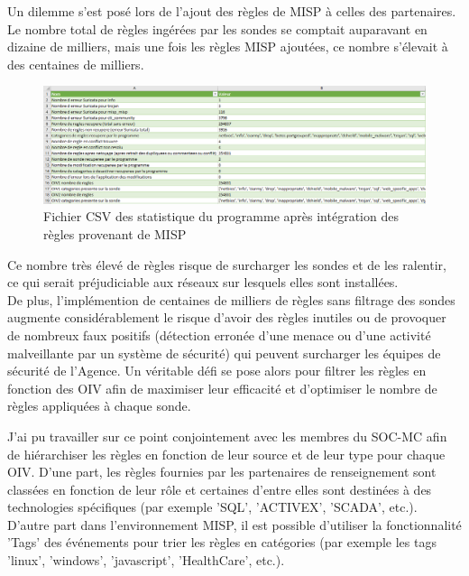 \vspace{1em}

Un dilemme s'est posé lors de l'ajout des règles de MISP à celles des partenaires. Le nombre total de règles ingérées par les sondes se comptait auparavant en dizaine de milliers, mais une fois les règles MISP ajoutées, ce nombre s'élevait à des centaines de milliers.\\

\vspace{1em}

\begin{figure}[h]%
    \center%
    \includegraphics[width=1
    \textwidth]{assets/statMISP.png}
    \caption[Fichier CSV des statistique du programme après intégration des règles provenant de MISP]{Fichier CSV des statistique du programme après intégration des règles provenant de MISP}\label{fig:statMISP}
\end{figure}

\vspace{1em}

Ce nombre très élevé de règles risque de surcharger les sondes et de les ralentir, ce qui serait préjudiciable aux réseaux sur lesquels elles sont installées.\\

De plus, l'implémention de centaines de milliers de règles sans filtrage des sondes augmente considérablement le risque d'avoir des règles inutiles ou de provoquer de nombreux faux positifs (détection erronée d'une menace ou d'une activité malveillante par un système de sécurité) qui peuvent surcharger les équipes de sécurité de l'Agence. Un véritable défi se  pose alors pour filtrer les règles en fonction des OIV afin de maximiser leur efficacité et d'optimiser le nombre de règles appliquées à chaque sonde.\\

\newpage

 J'ai pu travailler sur ce point conjointement avec les membres du SOC-MC afin de hiérarchiser les règles en fonction de leur source et de leur type pour chaque OIV. D'une part, les règles fournies par les partenaires de renseignement sont classées en fonction de leur rôle et certaines d'entre elles sont destinées à des technologies spécifiques (par exemple 'SQL', 'ACTIVEX', 'SCADA', etc.). D'autre part dans l'environnement MISP, il est possible d'utiliser la fonctionnalité 'Tags' des événements pour trier les règles en catégories (par exemple les tags 'linux', 'windows', 'javascript', 'HealthCare', etc.).\\

